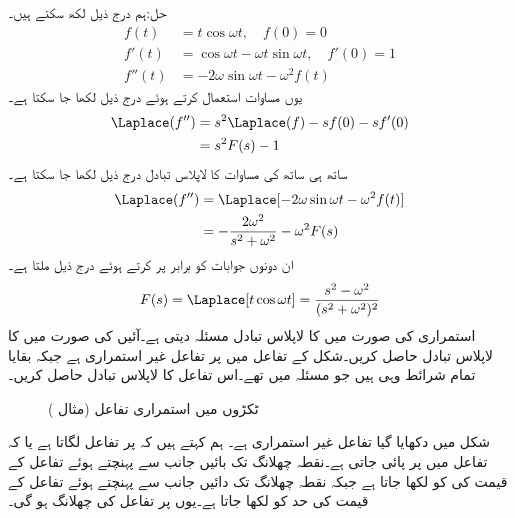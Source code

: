 حل:ہم درج ذیل لکھ سکتے ہیں۔
\begin{align*}
f(t)&=t\cos \omega t, \quad f(0)=0\\
f'(t)&=\cos \omega t-\omega t\sin \omega t, \quad f'(0)=1\\
f''(t)&=-2\omega \sin \omega t-\omega^2 f(t)
\end{align*}
یوں مساوات  استعمال کرتے ہوئے درج ذیل لکھا جا سکتا ہے۔
\begin{align*}
\Laplace(f'')&=s^2\Laplace(f)-sf(0)-sf'(0)\\
&=s^2F(s)-1
\end{align*}
ساتھ ہی ساتھ  کی مساوات کا لاپلاس تبادل درج ذیل لکھا جا سکتا ہے۔
\begin{align*}
\Laplace(f'')&=\Laplace[-2\omega \sin \omega t-\omega^2 f(t)]\\
&=-\frac{2\omega^2}{s^2+\omega^2}-\omega^2F(s)
\end{align*}
ان دونوں جوابات کو برابر پر کرتے ہوئے درج ذیل ملتا ہے۔
\begin{align}\label{مساوات-لاپلاس_کوسائن_ضرب_وقت}
F(s)=\Laplace[t\cos \omega t]=\frac{s^2-\omega^2}{(s^2+\omega^2)^2}
\end{align}
استمراری  کی صورت میں   کا لاپلاس تبادل مسئلہ  دیتی ہے۔آئیں   کی صورت میں  کا لاپلاس تبادل حاصل کریں۔شکل  کے تفاعل میں  پر تفاعل غیر استمراری ہے جبکہ بقایا تمام شرائط وہی ہیں جو مسئلہ  میں تھے۔اس تفاعل کا لاپلاس تبادل حاصل کریں۔
\begin{figure}
\centering
{}
\caption{ٹکڑوں میں استمراری تفاعل (مثال )}
\label{شکل_مثال_لاپلاس_ٹکڑوں_میں_استمراری}
\end{figure}

شکل  میں دکھایا گیا تفاعل  غیر استمراری ہے۔ ہم کہتے ہیں کہ  پر تفاعل  لگاتا ہے یا کہ تفاعل میں  پر  پائی جاتی ہے۔نقطہ چھلانگ تک بائیں جانب سے پہنچتے ہوئے تفاعل کے قیمت کی  کو  لکھا جاتا ہے جبکہ نقطہ چھلانگ تک دائیں جانب سے پہنچتے ہوئے تفاعل کے قیمت کی حد کو  لکھا جاتا ہے۔یوں  پر تفاعل کی چھلانگ  ہو گی۔

